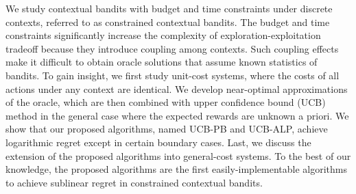 We study contextual bandits with budget and time constraints under discrete contexts, referred to as constrained contextual bandits. The budget and time constraints significantly increase the complexity of exploration-exploitation tradeoff because they introduce coupling among contexts. Such coupling effects make it difficult to obtain oracle solutions that assume known statistics of bandits. To gain insight, we first study unit-cost systems, where the costs of all actions under any context are identical. We  develop near-optimal approximations of the oracle, which are then combined with upper confidence bound (UCB) method in the general case where the expected rewards are unknown a priori. We show that our proposed algorithms, named UCB-PB and UCB-ALP, achieve logarithmic regret except in certain boundary cases. Last, we discuss the extension of the proposed algorithms into general-cost systems. To the best of our knowledge, the proposed algorithms are the first easily-implementable algorithms to achieve sublinear regret in constrained contextual bandits. 